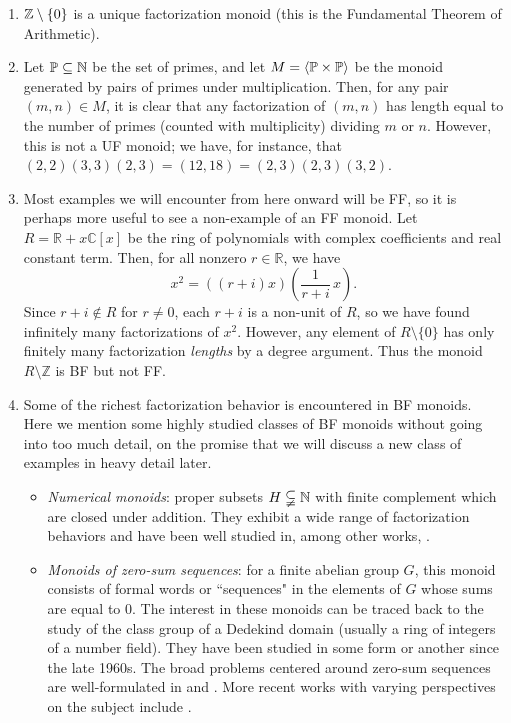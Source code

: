 \begin{enumerate}[label={\rm (\roman{*})}]
\item $\mathbb{Z}\setminus \{0\}$ is a unique factorization monoid (this is the Fundamental Theorem of Arithmetic).
\item Let $\mathbb{P} \subseteq \mathbb{N}$ be the set of primes, and let $M = \langle \mathbb{P}\times \mathbb{P} \rangle$ be the monoid generated by pairs of primes under multiplication.  
Then, for any pair $(m,n)\in M$, it is clear that any factorization of $(m,n)$ has length equal to the number of primes (counted with multiplicity) dividing $m$ or $n$.
However, this is not a UF monoid; we have, for instance, that $(2,2)(3,3)(2,3) = (12,18) = (2,3)(2,3)(3,2)$.
\item Most examples we will encounter from here onward will be FF, so it is perhaps more useful to see a non-example of an FF monoid.
Let $R = \mathbb{R} + x \mathbb{C}[x]$ be the ring of polynomials with complex coefficients and real constant term.
Then, for all nonzero $r\in \mathbb{R}$, we have
\[ x^2 = ((r+i)x)\left(\frac{1}{r+i}\,x\right). \]
Since $r+i\notin R$ for $r\neq0$, each $r+i$ is a non-unit of $R$, so we have found infinitely many factorizations of $x^2$.
However, any element of $R\setminus \{0\}$ has only finitely many factorization \textit{lengths} by a degree argument.
Thus the monoid $R\setminus \mathbb{Z}$ is BF but not FF.
\item Some of the richest factorization behavior is encountered in BF monoids.  
Here we mention some highly studied classes of BF monoids without going into too much detail, on the promise that we will discuss a new class of examples in heavy detail later.
\begin{itemize}
\item \textit{Numerical monoids}: proper subsets $H \subsetneqq \mathbb{N}$ with finite complement which are closed under addition. 
They exhibit a wide range of factorization behaviors and have been well studied in, among other works, \cite{oneill-pelayo17,oneill-pelayo18,barron-oneill-pelayo17,geroldinger-schmid18,conaway-etal18}.
\item \textit{Monoids of zero-sum sequences}: for a finite abelian group $G$, this monoid consists of formal words or ``sequences" in the elements of $G$ whose sums are equal to $0$.  
The interest in these monoids can be traced back to the study of the class group of a Dedekind domain (usually a ring of integers of a number field).  They have been studied in some form or another since the late 1960s.
The broad problems centered around zero-sum sequences are well-formulated in \cite{gao-geroldinger06} and \cite{geroldinger-hk06}.
More recent works with varying perspectives on the subject include \cite{gao-al18,savchev-chen17,girard-schmid19,girard-schmid20}.


\end{itemize}
\end{enumerate}
